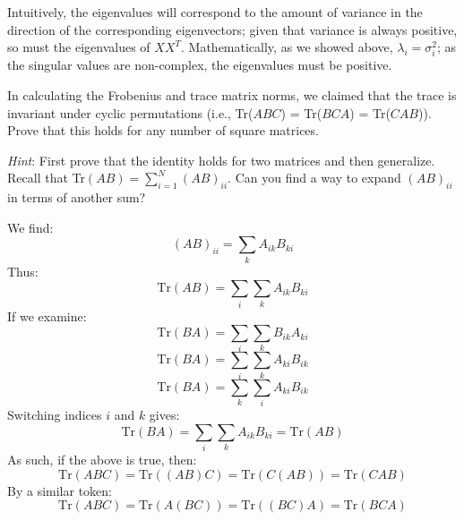 \begin{solution}
 Intuitively, the eigenvalues will correspond to the amount of variance in the direction of the corresponding eigenvectors; given that variance is always positive, so must the eigenvalues of $XX^T$. Mathematically, as we showed above, $\lambda_i=\sigma_i^2$; as the singular values are non-complex, the eigenvalues must be positive.
\end{solution}

\problem[5] In calculating the Frobenius and trace matrix norms, we claimed that the trace is invariant under cyclic permutations (i.e., Tr($ABC$) = Tr($BCA$) = Tr($CAB$)). Prove that this holds for any number of square matrices.

\textit{Hint}: First prove that the identity holds for two matrices and then generalize. Recall that Tr$(AB) = \sum_{i=1}^{N}(AB)_{ii}$. Can you find a way to expand $(AB)_{ii}$ in terms of another sum?

\begin{solution}
 We find:
 \begin{equation}
	 (AB)_{ii} = \sum_k A_{ik}B_{ki}
 \end{equation}
 Thus:
 \begin{equation}
	 \text{Tr}(AB) = \sum_i\sum_k A_{ik}B_{ki}
 \end{equation}
 If we examine:
 \begin{equation}
	\text{Tr}(BA) = \sum_i\sum_k B_{ik}A_{ki}
 \end{equation}
 \begin{equation}
	\text{Tr}(BA) = \sum_i\sum_k A_{ki}B_{ik}
 \end{equation}
 \begin{equation}
	\text{Tr}(BA) = \sum_k\sum_i A_{ki}B_{ik}
 \end{equation}
 Switching indices $i$ and $k$ gives:
 \begin{equation}
	\text{Tr}(BA) = \sum_i\sum_k A_{ik}B_{ki} = \text{Tr}(AB)
 \end{equation}
 As such, if the above is true, then:
 \begin{equation}
	\text{Tr}(ABC) = \text{Tr}((AB)C) = \text{Tr}(C(AB))=\text{Tr}(CAB)
 \end{equation}
 By a similar token:
 \begin{equation}
	\text{Tr}(ABC) = \text{Tr}(A(BC)) = \text{Tr}((BC)A)=\text{Tr}(BCA)
 \end{equation}
\end{solution}

